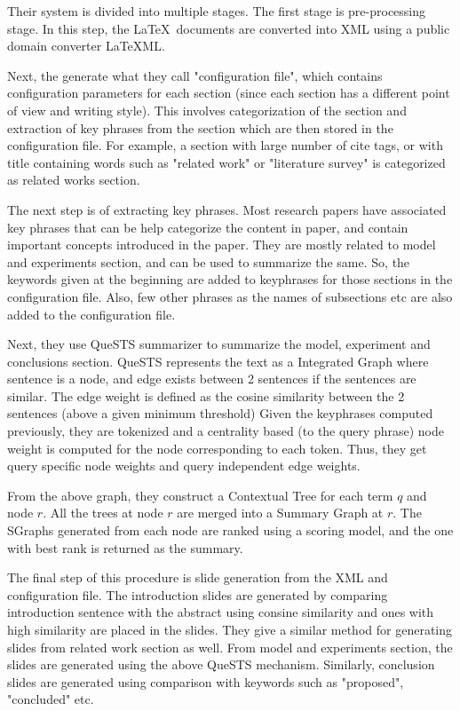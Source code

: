 \documentclass[10pt,twocolumn,letterpaper]{article}
\begin{document}
Their system is divided into multiple stages. The first stage is pre-processing stage.
In this step, the \LaTeX\ documents are converted into XML using a public domain converter
LaTeXML. 

Next, the generate what they call "configuration file", which contains configuration
parameters for each section (since each section has a different point of view and writing style).
This involves categorization of the section and extraction of key phrases from the section
which are then stored in the configuration file.
For example, a section with large number of cite tags, or with title containing words such as
"related work" or "literature survey" is categorized as related works section.

The next step is of extracting key phrases.	Most research papers have associated key phrases 
that can be help categorize the content in paper, and contain important concepts introduced
in the paper. They are mostly related to model and experiments section, and can be used to 
summarize the same. So, the keywords given at the beginning are added to keyphrases for those
sections in the configuration file. Also, few other phrases as the names of subsections etc 
are also added to the configuration file.

Next, they use QueSTS summarizer to summarize the model, experiment and conclusions section.
QueSTS represents the text as a Integrated Graph where sentence is a node, and edge exists 
between 2 sentences if the sentences are similar. The edge weight is defined as the 
cosine similarity between the 2 sentences (above a given minimum threshold)
Given the keyphrases computed previously, they are tokenized and 
a centrality based (to the query phrase) node weight is computed for the node corresponding to each token.
Thus, they get query specific node weights and query independent edge weights.

From the above graph, they construct a Contextual Tree for each term $q$ and node $r$.
All the trees at node $r$ are merged into a Summary Graph at $r$. The SGraphs generated
from each node are ranked using a scoring model, and the one with best rank is returned as
the summary.

The final step of this procedure is slide generation from the XML and configuration file.
The introduction slides are generated by comparing introduction sentence with the abstract 
using consine similarity and ones with high similarity are placed in the slides.
They give a similar method for generating slides from related work section as well.
From model and experiments section, the slides are generated using the above QueSTS
mechanism. Similarly, conclusion slides are generated using comparison with keywords
such as "proposed", "concluded" etc.
\end{document}
